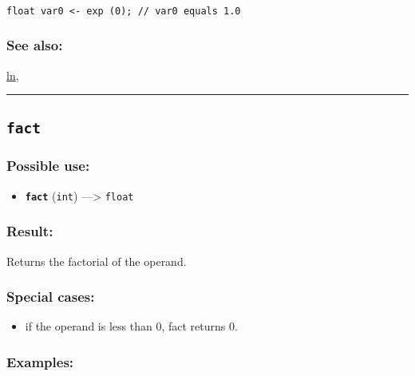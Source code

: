 \documentclass[]{book}
\providecommand{\tightlist}{%
  \setlength{\itemsep}{0pt}\setlength{\parskip}{0pt}}
\theoremstyle{definition}
\theoremstyle{definition}
\theoremstyle{definition}
\theoremstyle{remark}
\begin{document}
\begin{verbatim}
 
float var0 <- exp (0); // var0 equals 1.0
\end{verbatim}

\subsubsection{See also:}\label{see-also-90}

\href{OperatorsIM\#ln}{ln},

\begin{center}\rule{0.5\linewidth}{\linethickness}\end{center}

\subsection{\texorpdfstring{\texttt{fact}}{fact}}\label{fact}

\subsubsection{Possible use:}\label{possible-use-161}

\begin{itemize}
\tightlist
\item
  \textbf{\texttt{fact}} (\texttt{int}) ---\textgreater{} \texttt{float}
\end{itemize}

\subsubsection{Result:}\label{result-155}

Returns the factorial of the operand.

\subsubsection{Special cases:}\label{special-cases-59}

\begin{itemize}
\tightlist
\item
  if the operand is less than 0, fact returns 0.
\end{itemize}

\subsubsection{Examples:}\label{examples-120}
\end{document}
